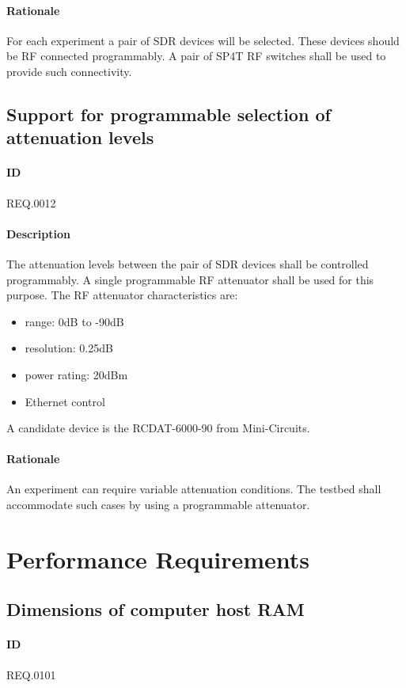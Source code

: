 \documentclass[english,titlepage,a4paper]{report}
\begin{document}
\paragraph{Rationale}
For each experiment a pair of SDR devices will be selected.
These devices should be RF connected programmably.
A pair of SP4T RF switches shall be used to provide such connectivity.

\subsection{Support for programmable selection of attenuation levels}
\paragraph{ID}
REQ.0012
\paragraph{Description}
The attenuation levels between the pair of SDR devices shall be controlled programmably.
A single programmable RF attenuator shall be used for this purpose.
The RF attenuator characteristics are:
\begin{itemize}
\item range: 0dB to -90dB
\item resolution: 0.25dB
\item power rating: 20dBm
\item Ethernet control
\end{itemize}
A candidate device is the RCDAT-6000-90 from Mini-Circuits.
\paragraph{Rationale}
An experiment can require variable attenuation conditions.
The testbed shall accommodate such cases by using a programmable attenuator.

\section{Performance Requirements}

\subsection{Dimensions of computer host RAM}
\paragraph{ID}
REQ.0101
\end{document}

